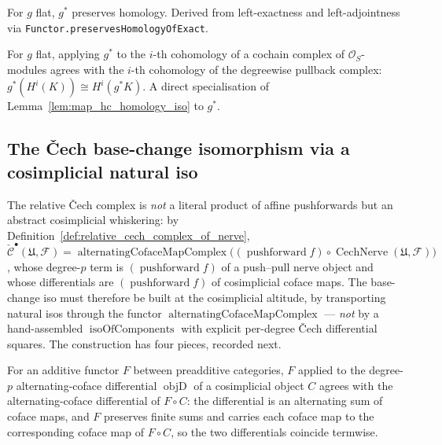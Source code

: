 \begin{lemma}
  \label{lem:pullback_preserves_homology}
  For \(g\) flat, \(g^*\) preserves homology. Derived from left-exactness and
  left-adjointness via \texttt{Functor.preservesHomologyOfExact}.
\end{lemma}

\begin{lemma}
  \label{lem:pullback_mapHC_homologyIso}
  For \(g\) flat, applying \(g^*\) to the \(i\)-th cohomology of a cochain complex of
  \(\mathcal{O}_S\)-modules agrees with the \(i\)-th cohomology of the degreewise
  pullback complex: \(g^*(H^i(K)) \cong H^i(g^* K)\). A direct specialisation of
  Lemma~\ref{lem:map_hc_homology_iso} to \(g^*\).
\end{lemma}

\subsection{The {\v C}ech base-change isomorphism via a cosimplicial natural iso}
\label{sec:cech_base_change_construction}

The relative {\v C}ech complex is \emph{not} a literal product of affine
pushforwards but an abstract cosimplicial whiskering: by
Definition~\ref{def:relative_cech_complex_of_nerve},
\(\check{\mathcal{C}}^\bullet(\mathfrak{U}, \mathcal{F}) =
\operatorname{alternatingCofaceMapComplex}\bigl((\operatorname{pushforward} f) \circ
\operatorname{CechNerve}(\mathfrak{U}, \mathcal{F})\bigr)\), whose degree-\(p\) term is
\((\operatorname{pushforward} f)\) of a push--pull nerve object and whose differentials
are \((\operatorname{pushforward} f)\) of cosimplicial coface maps. The base-change iso
must therefore be built at the cosimplicial altitude, by transporting natural isos
through the functor \(\operatorname{alternatingCofaceMapComplex}\) — \emph{not} by a
hand-assembled \(\operatorname{isoOfComponents}\) with explicit per-degree {\v C}ech
differential squares. The construction has four pieces, recorded next.

\begin{lemma}
  \label{lem:map_alternatingCofaceMapComplex_objD}
  For an additive functor \(F\) between preadditive categories, \(F\) applied to the
  degree-\(p\) alternating-coface differential \(\operatorname{objD}\) of a cosimplicial
  object \(C\) agrees with the alternating-coface differential of \(F \circ C\): the
  differential is an alternating sum of coface maps, and \(F\) preserves finite sums and
  carries each coface map to the corresponding coface map of \(F \circ C\), so the two
  differentials coincide termwise.
\end{lemma}

